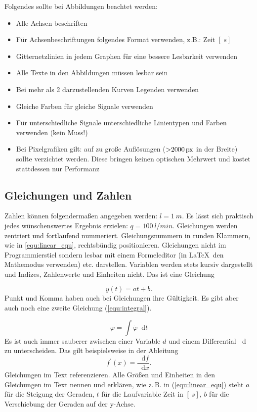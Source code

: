 \documentclass[a4paper, 12pt]{article}
\begin{document}
Folgendes sollte bei Abbildungen beachtet werden:
\begin{itemize}
    \item Alle Achsen beschriften
    \item Für Achsenbeschriftungen folgendes Format verwenden, z.B.: Zeit $[\SI{}{s}]$
    \item Gitternetzlinien in jedem Graphen für eine bessere Lesbarkeit verwenden
    \item Alle Texte in den Abbildungen müssen lesbar sein
    \item Bei mehr als 2 darzustellenden Kurven Legenden verwenden
    \item Gleiche Farben für gleiche Signale verwenden
    \item Für unterschiedliche Signale unterschiedliche Linientypen und Farben verwenden (kein Muss!)
    \item Bei Pixelgrafiken gilt: auf zu große Auflösungen ($\SI{>2000}{px}$ in der Breite) sollte verzichtet werden. Diese bringen keinen optischen Mehrwert und kostet stattdessen nur Performanz
\end{itemize}


\subsection{Gleichungen und Zahlen}
Zahlen können folgendermaßen angegeben werden: $l=\SI{1}{m}$. Es lässt sich praktisch jedes wünschenswertes Ergebnis erzielen: $q=\SI{100}{l/min}$. Gleichungen werden zentriert und fortlaufend nummeriert. Gleichungsnummern in runden Klammern, wie in \eqref{equ:linear_equ}, rechtsbündig positionieren. Gleichungen nicht im Programmierstiel sondern lesbar mit einem Formeleditor (in \LaTeX ~den Mathemodus verwenden) etc. darstellen. Variablen werden stets kursiv dargestellt und Indizes, Zahlenwerte und Einheiten nicht. Das ist eine Gleichung \

\begin{equation} \label{equ:linear_equ}
    y(t) = at+b.
\end{equation}
Punkt und Komma haben auch bei Gleichungen ihre Gültigkeit. Es gibt aber auch noch eine zweite Gleichung (\ref{equ:integral}).

\newcommand*\diff{\mathop{}\!\mathrm{d}}
\begin{equation}\label{equ:integral}
	\varphi = \int \dot{\varphi}  \diff t
\end{equation}
Es ist auch immer sauberer zwischen einer Variable $d$ und einem Differential $\diff$ zu unterscheiden. Das gilt beispielsweise in der Ableitung
\begin{equation}\label{equ:diff}
	f^{\prime} (x) = \frac{\diff f}{\diff x}.
\end{equation}
Gleichungen im Text referenzieren. Alle Größen und Einheiten in den Gleichungen im Text nennen und erklären, wie z.\,B. in (\ref{equ:linear_equ}) steht $a$ für die Steigung der Geraden, $t$ für die Laufvariable Zeit in $[\SI{}{s}]$, $b$ für die Verschiebung der Geraden auf der y-Achse.
\end{document}
